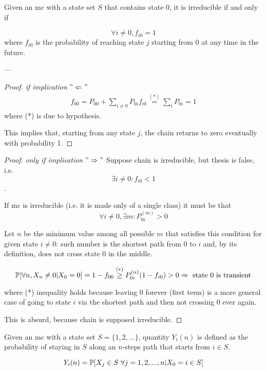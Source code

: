 	\begin{lemma}[Ross 2, pg. 78-82] \label{lemma:MC_irreducible_fi0}
		Given an \gls{mc} with a state set $S$ that contains state 0, it is irreducible if and only if

		$$ \forall i \neq 0, f_{i 0} = 1 $$
		where $f_{i 0}$ is the probability of reaching state $j$ starting from 0 at any time in the future.
	\end{lemma}
	---
	\begin{proof} \emph{if implication} $"\Leftarrow"$
		\begin{equation}\begin{split}
			f_{00} = P_{00} + \sum_{i \neq 0} P_{0i} f_{i 0} \stackrel{(*)}{=} \sum_{i} P_{0i} = 1
		\end{split}\end{equation}
		where (*) is due to hypothesis.

		This implies that, starting from any state $j$, the chain returns to zero eventually with probability 1.
	\end{proof}

	\begin{proof} \emph{only if implication} $"\Rightarrow"$
		Suppose chain is irreducible, but thesis is false, i.e.
		$$ \exists i \neq 0 : f_{i0} < 1 $$.

		If \gls{mc} is irreducible (i.e. it is made only of a single class) it must be that
		$$ \forall i \neq 0, \exists m : P_{0i}^{(m)} > 0 $$

		Let $n$ be the minimum value among all possible $m$  that satisfies this condition for given state $i \neq 0$: such number is the shortest path from 0 to $i$ and, by its definition, does not cross state 0 in the middle.

		$$ \mathbb{P}[\forall n, X_n \neq 0 | X_0 = 0] = 1 - f_{00} \stackrel{(*)}{\ge} P_{0i}^{(n)} (1 - f_{i0}) > 0 \Rightarrow \text{ state 0 is transient} $$

		where (*) inequality holds because leaving 0 forever (first term) is a more general case of going to state $i$ via the shortest path and then not crossing 0 ever again.

		This is absurd, because chain is supposed irreducible.
	\end{proof}

	\begin{definition}
		Given an \gls{mc} with a state set $S = \{1, 2, ...\}$, quantity $Y_i(n)$ is defined as the probability of staying in $S$ along an $n$-steps path that starts from $i \in S$.

		$$ Y_i(n) = \mathbb{P}[X_j \in S ~\forall j=1, 2, ..., n | X_0 = i \in S] $$
	\end{definition}

